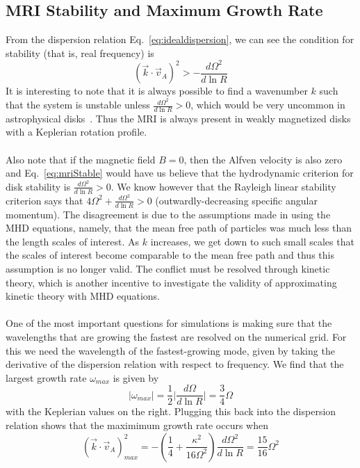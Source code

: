 \subsection{MRI Stability and Maximum Growth Rate}
From the dispersion relation Eq.~\ref{eq:idealdispersion}, we can see the condition for stability (that is, real frequency) is
\begin{equation}
  (\vec k\cdot\vec v_A)^2>-\frac{d\Omega^2}{d\ln R} \label{eq:mriStable}
\end{equation}
It is interesting to note that it is always possible to find a wavenumber $k$ such that the system is unstable unless $\frac{d\Omega^2}{d\ln R}>0$, which would be very uncommon in astrophysical disks~\cite{BH1998}. Thus the MRI is always present in weakly magnetized disks with a Keplerian rotation profile.\\
\\
Also note that if the magnetic field $B=0$, then the Alfven velocity is also zero and Eq.~\ref{eq:mriStable} would have us believe that the hydrodynamic criterion for disk stability is $\frac{d\Omega^2}{d\ln R}>0$. We know however that the Rayleigh linear stability criterion says that $4\Omega^2+\frac{d\Omega^2}{d\ln R}>0$ (outwardly-decreasing specific angular momentum). The disagreement is due to the assumptions made in using the MHD equations, namely, that the mean free path of particles was much less than the length scales of interest. As $k$ increases, we get down to such small scales that the scales of interest become comparable to the mean free path and thus this assumption is no longer valid. The conflict must be resolved through kinetic theory, which is another incentive to investigate the validity of approximating kinetic theory with MHD equations.\\
\\
One of the most important questions for simulations is making sure that the wavelengths that are growing the fastest are resolved on the numerical grid. For this we need the wavelength of the fastest-growing mode, given by taking the derivative of the dispersion relation with respect to frequency. We find that the largest growth rate $\omega_{max}$ is given by
\begin{equation}
  |\omega_{max}|=\frac12\big|\frac{d\Omega}{d\ln R}\big|=\frac34\Omega
\end{equation}
with the Keplerian values on the right. Plugging this back into the dispersion relation shows that the maximimum growth rate occurs when
\begin{equation}
  (\vec k\cdot\vec v_A)^2_{max}=-\left(\frac14+\frac{\kappa^2}{16\Omega^2}\right)\frac{d\Omega^2}{d\ln R}=\frac{15}{16}\Omega^2 \label{eq:idealmaxk}
\end{equation}
